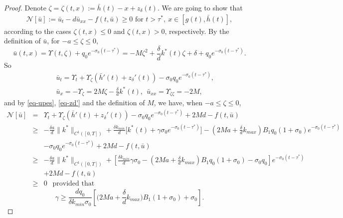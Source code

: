 \documentclass[11pt]{amsart}
\numberwithin{equation}{section}
\begin{document}
\begin{proof}
Denote $\zeta=\zeta (t,x):=\bar{h}(t)-x+z_\delta(t)$. We are going to show that 
\begin{eqnarray*}
  \mathcal{N}[\bar{u}]:=\bar{u}_t-d\bar{u}_{xx}-f(t,\bar{u})\geq 0 \mbox{ for } t>\tau^*,\  x\in[g(t),\bar{h}(t)],
\end{eqnarray*}
according to the cases  $\zeta(t,x)\leq 0$ and $\zeta(t,x)> 0$, respectively.
By the definition of $\bar{u}$, for  $-a\leq \zeta\leq 0$,
\begin{equation*}
  \bar{u}(t,x)=\Upsilon(t,\zeta)+ q_0e^{-\sigma_0(t-\tau^{*})}=-M\zeta^2+\frac{\delta}{d}k^*(t)\zeta+\delta+ q_0e^{-\sigma_0(t-\tau^{*})}.
\end{equation*}
So
\begin{eqnarray*}
  &&\bar{u}_t=\Upsilon_t+\Upsilon_\zeta(\bar{h}'(t)+z_\delta'(t))-\sigma_0q_0e^{-\sigma_0(t-\tau^*)},\\
  &&\bar{u}_x=- \Upsilon_\zeta=2M\zeta-\frac{\delta}{d}k^*(t),~~\bar{u}_{xx}= \Upsilon_{\zeta\zeta}=-2M,
\end{eqnarray*}
and by \eqref{eq-upes}, \eqref{eq-zd'} and the definition of $M$, we have, when $-a\leq\zeta\leq 0$,  
{\small \begin{eqnarray*}
  \mathcal{N}[\bar{u}]&=&\Upsilon_t+\Upsilon_\zeta(\bar{h}'(t)+z_\delta'(t))-\sigma_0q_0e^{-\sigma_0(t-\tau^*)}+2Md-f(t,\bar{u})\\
  &\geq & -\frac{\delta a}{d}\|k^{*}\|_{C^{1}([0,T])}+\frac{\delta  k_{min}}{d}\big[k^*(t)+\gamma\sigma_0e^{-\sigma_0(t-\tau^{*})}\big]-\left(2M a+\frac{\delta}{d}k_{max}\right) B_1q_0(1+\sigma_0)e^{-\sigma_0(t-\tau^*)}\\
  &&-\sigma_0q_0e^{-\sigma_0(t-\tau^*)}+2Md-f(t,\bar{u})\\
  &\geq &  -\frac{\delta a}{d}\|k^{*}\|_{C^{1}([0, T])}+\left[\frac{\delta  k_{min}}{d}\gamma\sigma_0-\left(2M a+\frac{\delta}{d}k_{max}\right) B_1q_0(1+\sigma_0)-\sigma_0q_0\right] e^{-\sigma_0(t-\tau^*)}\\
  && +2Md-f(t,\bar{u})\\
  &\geq& 0 \ \ \mbox{ provided that }
  \end{eqnarray*}}
\begin{equation}\label{eq-gq2}
  \gamma\geq \frac{dq_0}{\delta k_{min}\sigma_0}\left[\Big(2M a+\frac{\delta}{d} k_{max}\Big) B_1(1+\sigma_0)+\sigma_0\right].
\end{equation}


\end{proof}
\end{document}
